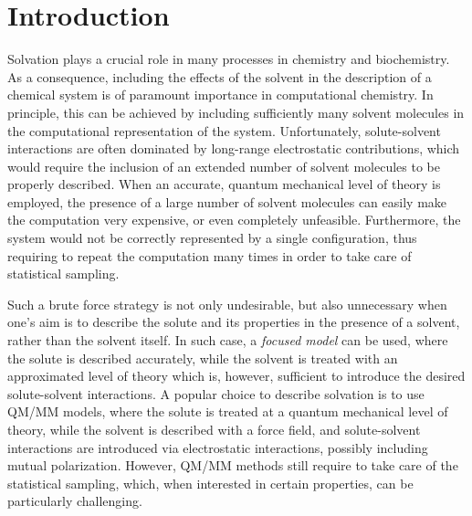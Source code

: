 \documentclass[aip,jcp,a4paper,11pt]{revtex4-1}
\begin{document}
\section{Introduction}\label{sec:intro}
Solvation plays a crucial role in many processes in chemistry and biochemistry. As a consequence, including the effects of the solvent in the description of a chemical system is of paramount importance in computational chemistry. In principle, this can be achieved by including sufficiently many solvent molecules in the computational representation of the system. Unfortunately, solute-solvent interactions are often dominated by long-range electrostatic contributions, which would require the inclusion of an extended number of solvent molecules to be properly described. When an accurate, quantum mechanical level of theory is employed, the presence of a large number of solvent molecules can easily make the computation very expensive, or even completely unfeasible. Furthermore, the system would not be correctly represented by a single configuration, thus requiring  to repeat the computation many times in order to take care of statistical sampling. 

Such a brute force strategy is not only undesirable, but also unnecessary when one's aim is to describe the solute and its properties in the presence of a solvent, rather than the solvent itself. In such case, a \textit{focused model} can be used, where the solute is described accurately, while the solvent is treated with an approximated level of theory which is, however, sufficient to introduce the desired solute-solvent interactions. 
A popular choice to describe solvation is to use QM/MM models\cite{Warshel_JMB_QMMM,Warshel_JACS_QMMM,Gao_Science_QMMM,Bakowies_JPC_QMMM,Truhlar_TCA_QMMMReview,Thiel_ACIE_QMMMReview,
Barone_Libro_QMMM,Morokuma_CR_ONIOM,Cappelli_IJQC_FQRev}, where the solute is treated at a quantum mechanical level of theory, while the solvent is described with a force field, and solute-solvent interactions are introduced via electrostatic interactions, possibly including mutual polarization\cite{Curutchet_JCTC_MMPol,Kongsted_JCTC_MMPExc,Christiansen_JCTC_MMPExcCCDFT,Steindal_PCCP_MMPExc,Caprasecca_JCTC_FMM,Lipparini_JCP_FQMag,Lipparini_JCTC_FQTD,Boulanger_JCTC_Drude,Boulanger_JCTC_QMMMPolPCM,Loco_JCTC_QMAMOEBA}. However, QM/MM methods still require to take care of the statistical sampling, which, when interested in certain properties, can be particularly challenging\cite{Lipparini_JCTC_ORMoxy,Giovannini_JCTC_FQVCD,Giovannini_JCTC_FQROA}.
\end{document}
